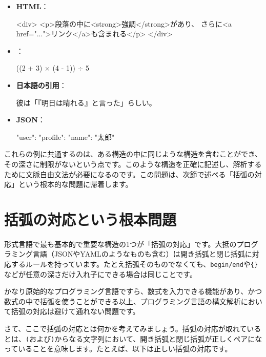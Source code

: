 \begin{itemize}
\item
  \textbf{\sffamily HTML}：

\begin{codescreen}{}
<div>
    <p>段落の中に<strong>強調</strong>があり、
       さらに<a href="...">リンク</a>も含まれる</p>
</div>
\end{codescreen}
\item
  ：

\begin{codescreen}{}
((2 + 3) × (4 - 1)) ÷ 5
\end{codescreen}
\item
  \textbf{日本語の引用}：

\begin{codescreen}{}
彼は「『明日は晴れる』と言った」らしい。
\end{codescreen}
\item
  \textbf{\sffamily JSON}：

\begin{codescreen}{}
{
  "user": {
    "profile": {
      "name": "太郎"
    }
  }
}
\end{codescreen}
\end{itemize}

\enlargethispage{\baselineskip}これらの例に共通するのは、ある構造の中に同じような構造を含むことができ、その深さに制限がないという点です。このような構造を正確に記述し、解析するために文脈自由文法が必要になるのです。この問題は、次節で述べる「括弧の対応」という根本的な問題に帰着します。

\section{括弧の対応という根本問題}

形式言語で最も基本的で重要な構造の1つが「括弧の対応」です。大抵のプログラミング言語（JSONやYAMLのようなものも含む）は開き括弧と閉じ括弧に対応するルールを持っています。たとえ括弧そのものでなくても、\texttt{begin/end}や\texttt{\{\}}などが任意の深さだけ入れ子にできる場合は同じことです。

かなり原始的なプログラミング言語ですら、数式を入力できる機能があり、かつ数式の中で括弧を使うことができる以上、プログラミング言語の構文解析において括弧の対応は避けて通れない問題です。

さて、ここで括弧の対応とは何かを考えてみましょう。括弧の対応が取れているとは、\texttt{(}および\texttt{)}からなる文字列において、開き括弧と閉じ括弧が正しくペアになっていることを意味します。たとえば、以下は正しい括弧の対応です。

